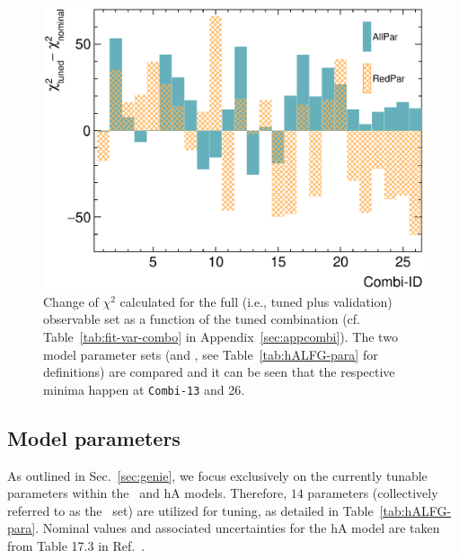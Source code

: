 \begin{figure}[!htb] 
    \centering 		
    \includegraphics[width=\sgfigwid\textwidth]{figures/tuning/chi2_hist_covfix.eps} 
    \caption{\label{fig:allchi} Change of $\chi^2$ calculated for the full (i.e., tuned plus validation) observable set as a function of the tuned combination (cf. Table~\ref{tab:fit-var-combo} in Appendix~\ref{sec:appcombi}). The two model parameter sets (\allpar and \redpar, see Table~\ref{tab:hALFG-para} for definitions) are compared and it can be seen that the respective minima happen at \texttt{Combi-13} and 26. }   
\end{figure}

\subsection{\label{sec:tuning-para-choice} Model parameters}
As outlined in Sec.~\ref{sec:genie}, we focus exclusively on the currently tunable parameters within the \sfcfg\ and hA models. 
Therefore, $14$ parameters (collectively referred to as the \allpar\ set) are utilized for tuning, as detailed in Table~\ref{tab:hALFG-para}. 
Nominal values and associated uncertainties for the hA model are taken from Table 17.3 in Ref.~\cite{Andreopoulos:2015wxa}. 

